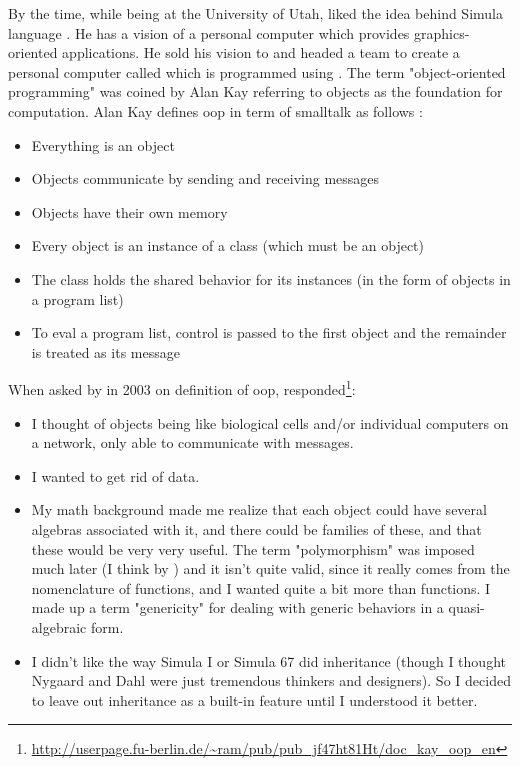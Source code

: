 \documentclass[12pt]{KodeBookAr}
\begin{document}
By the time, while being at the University of Utah,  liked the idea behind Simula language \citep{2004-huang}. 
He has a vision of a personal computer which provides graphics-oriented applications. 
He sold his vision to  and headed a team to create a personal computer called  which is programmed using .
The term "object-oriented programming" was coined by Alan Kay referring to objects as the foundation for computation.
Alan Kay defines \ac{oop} in term of smalltalk as follows \citep{1993-kay,2014-cunningham}:
\begin{itemize}
	\item Everything is an object
	\item Objects communicate by sending and receiving messages
	\item Objects have their own memory 
	\item Every object is an instance of a class (which must be an object)
	\item The class holds the shared behavior for its instances (in the form of objects in a program list)
	\item To eval a program list, control is passed to the first object and the remainder is treated as its message
\end{itemize}
When asked by  in 2003 on definition of \ac{oop},  responded\footnote{\url{http://userpage.fu-berlin.de/~ram/pub/pub_jf47ht81Ht/doc_kay_oop_en}}:
\begin{itemize}
	\item I thought of objects being like biological cells and/or individual computers on a network, only able to communicate with messages.
	\item I wanted to get rid of data.
	\item My math background made me realize that each object could have several algebras associated with it, and there could be families of these, and that these would be very very useful. 
	The term "polymorphism" was imposed much later (I think by ) and it isn't quite valid, since it really comes from the nomenclature of functions, and I wanted quite a bit more than functions. 
	I made up a term "genericity" for dealing with generic behaviors in a quasi-algebraic form.
	\item I didn't like the way Simula I or Simula 67 did inheritance (though I thought Nygaard and Dahl were just tremendous thinkers and designers). So I decided to leave out inheritance as a built-in feature until I understood it better.
\end{itemize}
\end{document}
